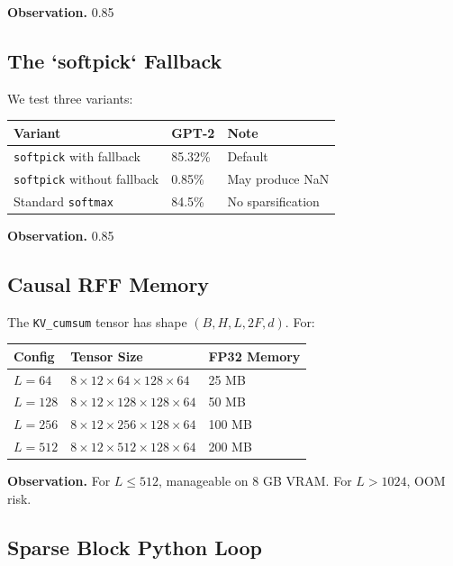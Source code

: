 \textbf{Observation.} 0.85

\subsection{The `softpick` Fallback}

We test three variants:

\begin{table}[H]
\centering
\small
\begin{tabular}{lll}
\toprule
\textbf{Variant} & \textbf{GPT-2} & \textbf{Note} \\
\midrule
\texttt{softpick} with fallback & 85.32\% & Default \\
\texttt{softpick} without fallback & 0.85\% & May produce NaN \\
Standard \texttt{softmax} & 84.5\% & No sparsification \\
\bottomrule
\end{tabular}
\end{table}

\textbf{Observation.} 0.85

\subsection{Causal RFF Memory}

The \texttt{KV\_cumsum} tensor has shape $(B, H, L, 2F, d)$. For:

\begin{table}[H]
\centering
\small
\begin{tabular}{lll}
\toprule
\textbf{Config} & \textbf{Tensor Size} & \textbf{FP32 Memory} \\
\midrule
$L=64$ & $8 \times 12 \times 64 \times 128 \times 64$ & 25 MB \\
$L=128$ & $8 \times 12 \times 128 \times 128 \times 64$ & 50 MB \\
$L=256$ & $8 \times 12 \times 256 \times 128 \times 64$ & 100 MB \\
$L=512$ & $8 \times 12 \times 512 \times 128 \times 64$ & 200 MB \\
\bottomrule
\end{tabular}
\end{table}

\textbf{Observation.} For $L \le 512$, manageable on 8 GB VRAM. For $L > 1024$, 
OOM risk.

\subsection{Sparse Block Python Loop}

